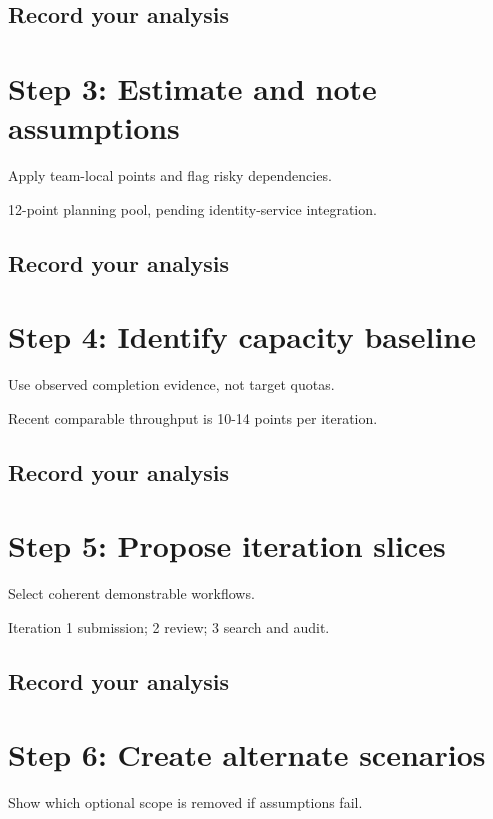\documentclass[11pt,letterpaper]{article}
\begin{document}
\subsection{Record your analysis}
\section{Step 3: Estimate and note assumptions}
Apply team-local points and flag risky dependencies.

\begin{tcolorbox}[colback=tealback,colframe=navy,title={Illustration},breakable]
12-point planning pool, pending identity-service integration.

\end{tcolorbox}
\subsection{Record your analysis}
\section{Step 4: Identify capacity baseline}
Use observed completion evidence, not target quotas.

\begin{tcolorbox}[colback=tealback,colframe=navy,title={Illustration},breakable]
Recent comparable throughput is 10-14 points per iteration.

\end{tcolorbox}
\subsection{Record your analysis}
\section{Step 5: Propose iteration slices}
Select coherent demonstrable workflows.

\begin{tcolorbox}[colback=tealback,colframe=navy,title={Illustration},breakable]
Iteration 1 submission; 2 review; 3 search and audit.

\end{tcolorbox}
\subsection{Record your analysis}
\section{Step 6: Create alternate scenarios}
Show which optional scope is removed if assumptions fail.
\end{document}
